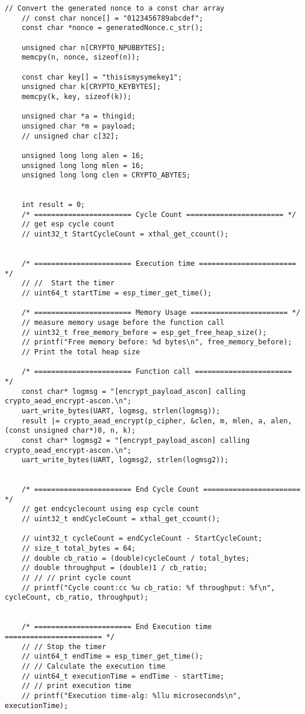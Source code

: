 \begin{lstlisting}[style=CStyle, caption={Main Source C File of The Proposed Implementation}, label={list:mainc-ascon}]
    // Convert the generated nonce to a const char array
    // const char nonce[] = "0123456789abcdef";
    const char *nonce = generatedNonce.c_str();

    unsigned char n[CRYPTO_NPUBBYTES]; 
    memcpy(n, nonce, sizeof(n));

    const char key[] = "thisismysymekey1";
    unsigned char k[CRYPTO_KEYBYTES];
    memcpy(k, key, sizeof(k));

    unsigned char *a = thingid;
    unsigned char *m = payload;
    // unsigned char c[32];

    unsigned long long alen = 16;
    unsigned long long mlen = 16;
    unsigned long long clen = CRYPTO_ABYTES;


    int result = 0;
    /* ======================= Cycle Count ======================= */
    // get esp cycle count
    // uint32_t StartCycleCount = xthal_get_ccount(); 


    /* ======================= Execution time ======================= */
    // //  Start the timer
    // uint64_t startTime = esp_timer_get_time();

    /* ======================= Memory Usage ======================= */
    // measure memory usage before the function call
    // uint32_t free_memory_before = esp_get_free_heap_size();
    // printf("Free memory before: %d bytes\n", free_memory_before);
    // Print the total heap size

    /* ======================= Function call ======================= */
    const char* logmsg = "[encrypt_payload_ascon] calling crypto_aead_encrypt-ascon.\n";
    uart_write_bytes(UART, logmsg, strlen(logmsg));
    result |= crypto_aead_encrypt(p_cipher, &clen, m, mlen, a, alen, (const unsigned char*)0, n, k);
    const char* logmsg2 = "[encrypt_payload_ascon] calling crypto_aead_encrypt-ascon.\n";
    uart_write_bytes(UART, logmsg2, strlen(logmsg2));

  
    /* ======================= End Cycle Count ======================= */
    // get endcyclecount using esp cycle count
    // uint32_t endCycleCount = xthal_get_ccount();

    // uint32_t cycleCount = endCycleCount - StartCycleCount;
    // size_t total_bytes = 64;
    // double cb_ratio = (double)cycleCount / total_bytes;
    // double throughput = (double)1 / cb_ratio;
    // // // print cycle count
    // printf("Cycle count:cc %u cb_ratio: %f throughput: %f\n", cycleCount, cb_ratio, throughput);
    
    
    /* ======================= End Execution time ======================= */
    // // Stop the timer
    // uint64_t endTime = esp_timer_get_time();
    // // Calculate the execution time
    // uint64_t executionTime = endTime - startTime;
    // // print execution time
    // printf("Execution time-alg: %llu microseconds\n", executionTime);


\end{lstlisting}
